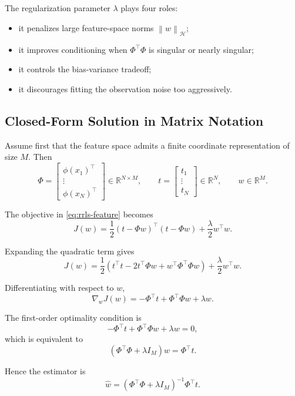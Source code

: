 \documentclass[11pt]{article}
\newcommand{\R}{\mathbb{R}}
\newcommand{\Hspace}{\mathcal{H}}
\newcommand{\norm}[1]{\left\lVert #1 \right\rVert}
\newcommand{\transpose}{^{\top}}
\begin{document}
The regularization parameter $\lambda$ plays four roles:
\begin{itemize}
\item it penalizes large feature-space norms $\norm{w}_{\Hspace}$;
\item it improves conditioning when $\Phi\transpose \Phi$ is singular or nearly singular;
\item it controls the bias-variance tradeoff;
\item it discourages fitting the observation noise too aggressively.
\end{itemize}

\subsection{Closed-Form Solution in Matrix Notation}

Assume first that the feature space admits a finite coordinate representation of size $M$. Then
\[
\Phi
=
\begin{bmatrix}
\phi(x_1)\transpose \\
\vdots \\
\phi(x_N)\transpose
\end{bmatrix}
\in \R^{N \times M},
\qquad
t =
\begin{bmatrix}
t_1 \\
\vdots \\
t_N
\end{bmatrix}
\in \R^N,
\qquad
w \in \R^M.
\]

The objective in \eqref{eq:rrls-feature} becomes
\[
J(w)
=
\frac{1}{2}(t-\Phi w)\transpose (t-\Phi w)
+
\frac{\lambda}{2} w\transpose w.
\]

Expanding the quadratic term gives
\[
J(w)
=
\frac{1}{2}
\left(
t\transpose t
- 2 t\transpose \Phi w
+ w\transpose \Phi\transpose \Phi w
\right)
+
\frac{\lambda}{2} w\transpose w.
\]

Differentiating with respect to $w$,
\[
\nabla_w J(w)
=
-\Phi\transpose t + \Phi\transpose \Phi w + \lambda w.
\]

The first-order optimality condition is
\[
-\Phi\transpose t + \Phi\transpose \Phi w + \lambda w = 0,
\]
which is equivalent to
\begin{equation}
(\Phi\transpose \Phi + \lambda I_M)w = \Phi\transpose t.
\label{eq:normal-equation}
\end{equation}

Hence the estimator is
\begin{equation}
\widehat{w}
=
(\Phi\transpose \Phi + \lambda I_M)^{-1}\Phi\transpose t.
\label{eq:primal-solution}
\end{equation}
\end{document}
